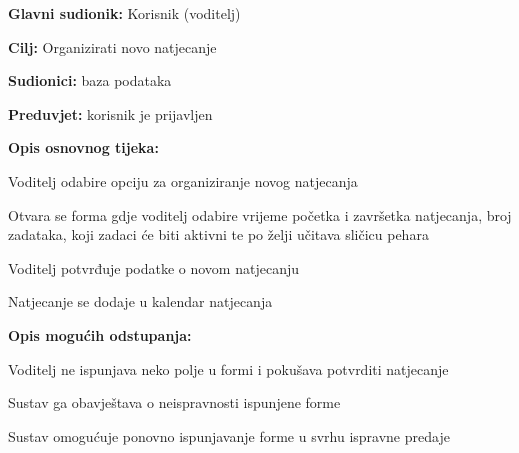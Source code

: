 					\noindent {}
					\begin{packed_item}
						
						\item \textbf{Glavni sudionik: }Korisnik (voditelj)
						\item \textbf{Cilj:} Organizirati novo natjecanje
						\item \textbf{Sudionici:} baza podataka
						\item \textbf{Preduvjet:} korisnik je prijavljen
						\item \textbf{Opis osnovnog tijeka:}
						
						\item[] \begin{packed_enum}
							\item Voditelj odabire opciju za organiziranje novog natjecanja
							\item Otvara se forma gdje voditelj odabire vrijeme početka i završetka natjecanja, broj zadataka, koji zadaci će biti aktivni te po želji učitava sličicu pehara
							\item Voditelj potvrđuje podatke o novom natjecanju
							\item Natjecanje se dodaje u kalendar natjecanja
							
						\end{packed_enum}
						
						\item  \textbf{Opis mogućih odstupanja:}
						\item[] \begin{packed_item}
							
							\item[2.a] Voditelj ne ispunjava neko polje u formi i pokušava potvrditi natjecanje
							\item[] \begin{packed_enum}
								
								\item Sustav ga obavještava o neispravnosti ispunjene forme
								\item Sustav omogućuje ponovno ispunjavanje forme u svrhu ispravne predaje
								
							\end{packed_enum}
						\end{packed_item}
					\end{packed_item}
										
